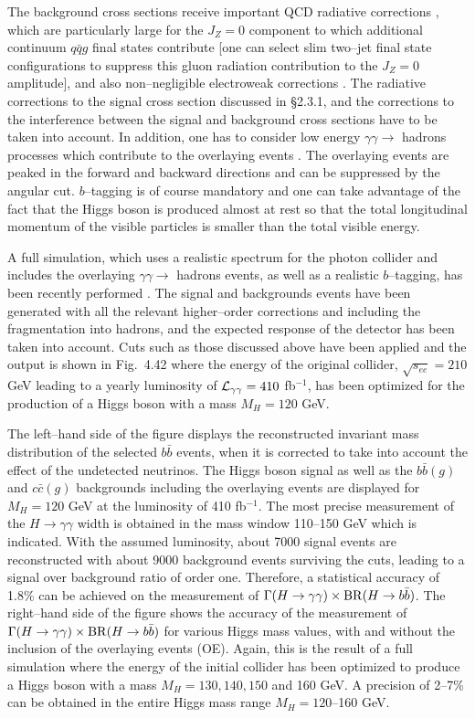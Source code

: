 The background cross sections receive important QCD radiative corrections
\cite{gam-ff-NLO1,gam-ff-NLO2}, which are particularly large for the $J_Z=0$ 
component to which additional continuum $q\bar{q}g$ final states contribute 
[one can select slim two--jet final state configurations to suppress this gluon
radiation  contribution to the $J_Z=0$ amplitude], and also non--negligible
electroweak corrections \cite{gam-ff-ew}. The radiative corrections to the 
signal
cross section discussed in \S2.3.1, and the corrections to the interference
between the signal and background cross sections \cite{gam-ff-Maggie} have to
be taken into account. In addition, one has to consider low energy $\gamma
\gamma \to$ hadrons processes which contribute to the overlaying events  
\cite{Manuel+Rohini}. The overlaying events are peaked in the forward and
backward directions and can be suppressed  by the angular cut. $b$--tagging is
of course mandatory and one can take advantage of the fact that the Higgs boson
is produced almost at rest so that the total longitudinal momentum of the 
visible particles is smaller than the total visible energy.\s

A full simulation, which uses a realistic spectrum for the photon collider and
includes the overlaying $\gamma \gamma \to$ hadrons events, as well as a
realistic $b$--tagging, has been recently performed \cite{gam-Hff-Warsaw}. The
signal  and backgrounds  events have been generated with all the relevant
higher--order corrections and including the fragmentation into hadrons, and the
expected response of the detector has been taken into account. Cuts such as 
those
discussed above have been applied and the output is shown in Fig.~4.42 where
the energy of the original collider, $\sqrt{s_{ee}}=210$ GeV leading to a
yearly luminosity of ${\cal L}_{\gamma \gamma}=410$ fb$^{-1}$, has been
optimized for the production of a Higgs boson with a mass $M_H=120$ GeV.\s

The left--hand side of the figure displays the reconstructed invariant mass
distribution of the selected $b\bar b$ events, when it is corrected to take 
into account the effect of the undetected neutrinos. The Higgs boson signal
as well as the $b\bar b (g)$ and $c \bar c (g)$ backgrounds including the 
overlaying events are displayed for $M_H=120$ GeV at the luminosity of 410 
fb$^{-1}$. The most precise measurement of the $H\to \gamma \gamma$ width is
obtained in the mass window 110--150 GeV which is indicated. With
the assumed luminosity, about 7000 signal events are reconstructed with 
about 9000 background events surviving the cuts, leading to a signal over 
background ratio of order one. Therefore, a statistical accuracy of 1.8\% can 
be achieved on the measurement of $\Gamma (H \to \gamma \gamma) \times {\rm BR}
(H\to b \bar{b})$. The right--hand side of the figure shows the accuracy 
of the measurement of $\Gamma (H \to \gamma \gamma) \times {\rm BR}
(H\to b \bar{b})$ for various Higgs mass values, with and without the inclusion 
of the overlaying events (OE). Again, this is the result of a full simulation 
where the energy of the initial collider has been optimized to produce a Higgs 
boson with a mass $M_H=130,140,150$ and 160 GeV. A precision of 2--7\% can be 
obtained in the entire Higgs mass range  $M_H=120$--160 GeV. \s

